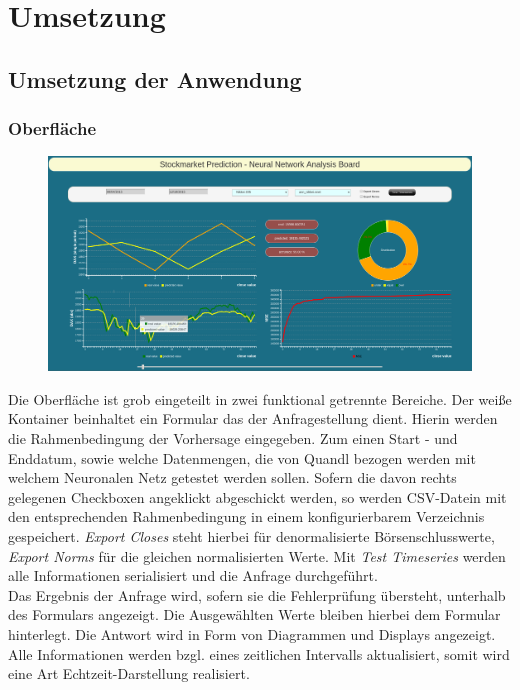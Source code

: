 \chapter{Umsetzung} %

\section{Umsetzung der Anwendung}

\subsection{Oberfläche}
\begin{figure}
\includegraphics[width=15cm]{Mokup_GUI.png}
\end{figure}
Die Oberfläche ist grob eingeteilt in zwei funktional getrennte Bereiche. Der weiße Kontainer beinhaltet ein Formular das der Anfragestellung dient. Hierin werden die Rahmenbedingung der Vorhersage eingegeben. Zum einen Start - und Enddatum, sowie welche Datenmengen, die von Quandl bezogen werden mit welchem Neuronalen Netz getestet werden sollen. Sofern die davon rechts gelegenen Checkboxen angeklickt abgeschickt werden, so werden CSV-Datein mit den entsprechenden Rahmenbedingung in einem konfigurierbarem Verzeichnis gespeichert. \emph{Export Closes} steht hierbei für denormalisierte Börsenschlusswerte, \emph{Export Norms} für die gleichen normalisierten Werte. Mit \emph{Test Timeseries} werden alle Informationen serialisiert und die Anfrage durchgeführt.\\
Das Ergebnis der Anfrage wird, sofern sie die Fehlerprüfung übersteht, unterhalb des Formulars angezeigt. Die Ausgewählten Werte bleiben hierbei dem Formular hinterlegt.
Die Antwort wird in Form von Diagrammen und Displays angezeigt. Alle Informationen werden bzgl. eines zeitlichen Intervalls aktualisiert, somit wird eine Art Echtzeit-Darstellung realisiert.\\ 
